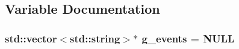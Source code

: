 \subsection{Variable Documentation}
\hypertarget{gtest-listener__test_8cc_a32a264046f3603db11e6fcdaea5fb094}{
\subsubsection[{g\-\_\-events}]{\setlength{\rightskip}{0pt plus 5cm}std\-::vector$<$std\-::string$>$$\ast$ g\-\_\-events = N\-U\-L\-L}}\label{gtest-listener__test_8cc_a32a264046f3603db11e6fcdaea5fb094}
